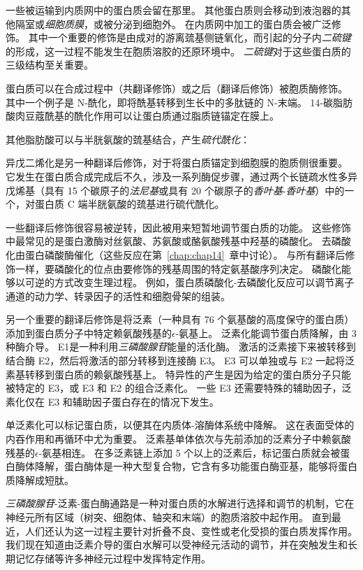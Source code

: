 一些被运输到内质网中的蛋白质会留在那里。
其他蛋白质则会移动到液泡器的其他隔室或\textit{细胞质膜}，或被分泌到细胞外。
在内质网中加工的蛋白质会被广泛修饰。
其中一个重要的修饰是由成对的游离巯基侧链氧化，而引起的分子内\textit{二硫键}的形成，这一过程不能发生在胞质溶胶的还原环境中。
\textit{二硫键}对于这些蛋白质的三级结构至关重要。


蛋白质可以在合成过程中（共翻译修饰）或之后（翻译后修饰）被胞质酶修饰。
其中一个例子是 N-酰化，即将酰基转移到生长中的多肽链的 N-末端。
14-碳脂肪酸肉豆蔻酰基的酰化作用可以让蛋白质通过脂质链锚定在膜上。


其他脂肪酸可以与半胱氨酸的巯基结合，产生\textit{硫代酰化}：

异戊二烯化是另一种翻译后修饰，对于将蛋白质锚定到细胞膜的胞质侧很重要。
它发生在蛋白质合成完成后不久，涉及一系列酶促步骤，通过两个长链疏水性多异戊烯基（具有 15 个碳原子的\textit{法尼基}或具有 20 个碳原子的\textit{香叶基}-\textit{香叶基}）中的一个，对蛋白质 C 端半胱氨酸的巯基进行硫代酰化。


一些翻译后修饰很容易被逆转，因此被用来短暂地调节蛋白质的功能。
这些修饰中最常见的是蛋白激酶对丝氨酸、苏氨酸或酪氨酸残基中羟基的磷酸化。
去磷酸化由蛋白磷酸酶催化（这些反应在第~\ref{chap:chap14}~章中讨论）。
与所有翻译后修饰一样，要磷酸化的位点由要修饰的残基周围的特定氨基酸序列决定。
磷酸化能够以可逆的方式改变生理过程。
例如，蛋白质磷酸化-去磷酸化反应可以调节离子通道的动力学、转录因子的活性和细胞骨架的组装。


另一个重要的翻译后修饰是将泛素（一种具有 76 个氨基酸的高度保守的蛋白质）添加到蛋白质分子中特定赖氨酸残基的$\epsilon$-氨基上。
泛素化能调节蛋白质降解，由 3 种酶介导。
E1是一种利用\textit{三磷酸腺苷}能量的活化酶。
激活的泛素接下来被转移到结合酶 E2，然后将激活的部分转移到连接酶 E3。
E3 可以单独或与 E2 一起将泛素基转移到蛋白质的赖氨酸残基上。
特异性的产生是因为给定的蛋白质分子只能被特定的 E3，或 E3 和 E2 的组合泛素化。
一些 E3 还需要特殊的辅助因子，泛素化仅在 E3 和辅助因子蛋白存在的情况下发生。


单泛素化可以标记蛋白质，以便其在内质体-溶酶体系统中降解。
这在表面受体的内吞作用和再循环中尤为重要。
泛素基单体依次与先前添加的泛素分子中赖氨酸残基的$\epsilon$-氨基相连。
在多泛素链上添加 5 个以上的泛素后，标记蛋白质就会被蛋白酶体降解，蛋白酶体是一种大型复合物，它含有多功能蛋白酶亚基，能够将蛋白质降解成短肽。


\textit{三磷酸腺苷}-泛素-蛋白酶通路是一种对蛋白质的水解进行选择和调节的机制，它在神经元所有区域（树突、细胞体、轴突和末端）的胞质溶胶中起作用。
直到最近，人们还认为这一过程主要针对折叠不良、变性或老化受损的蛋白质发挥作用。
我们现在知道由泛素介导的蛋白水解可以受神经元活动的调节，并在突触发生和长期记忆存储等许多神经元过程中发挥特定作用。


